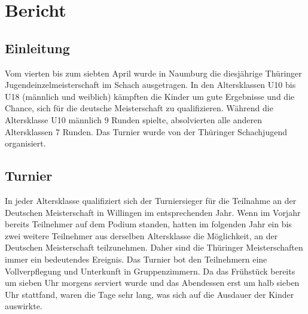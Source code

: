 \documentclass[a4paper,ngerman]{tui-algo-seminar}
\title{\inhalt}
\author{Erik Skopp}
\newcommand{\inhalt}{Thüringer Jugend Einzelmeisterschaft 2024}
\begin{document}
\maketitle
\thispagestyle{plain}
\begin{abstract}
    Bericht: \inhalt.\\
    Vom 4. bis zum 7. April fand in Naumburg (Sachsen-Anhalt) die diesjährige Thüringer Jugend-Einzelmeisterschaft im Schach statt. In jeder Altersklasse wurden sieben Runden nach dem Schweizer System ausgetragen. Die Gewinner qualifizieren sich für die Deutsche Einzelmeisterschaft in Willingen.
\end{abstract}

\tableofcontents 

\clearpage

\section{Bericht}


\subsection{Einleitung}

Vom vierten bis zum siebten April wurde in Naumburg die diesjährige Thüringer Jugendeinzelmeisterschaft im Schach ausgetragen. In den Altersklassen U10 bis U18 (männlich und weiblich) kämpften die Kinder um gute Ergebnisse und die Chance, sich für die deutsche Meisterschaft zu qualifizieren. Während die Altersklasse U10 männlich 9 Runden spielte, absolvierten alle anderen Altersklassen 7 Runden. Das Turnier wurde von der Thüringer Schachjugend organisiert.

\subsection{Turnier}

In jeder Altersklasse qualifiziert sich der Turniersieger für die Teilnahme an der Deutschen Meisterschaft in Willingen im entsprechenden Jahr. Wenn im Vorjahr bereits Teilnehmer auf dem Podium standen, hatten im folgenden Jahr ein bis zwei weitere Teilnehmer aus derselben Altersklasse die Möglichkeit, an der Deutschen Meisterschaft teilzunehmen. Daher sind die Thüringer Meisterschaften immer ein bedeutendes Ereignis. Das Turnier bot den Teilnehmern eine Vollverpflegung und Unterkunft in Gruppenzimmern. Da das Frühstück bereits um sieben Uhr morgens serviert wurde und das Abendessen erst um halb sieben Uhr stattfand, waren die Tage sehr lang, was sich auf die Ausdauer der Kinder auswirkte.
\end{document}
